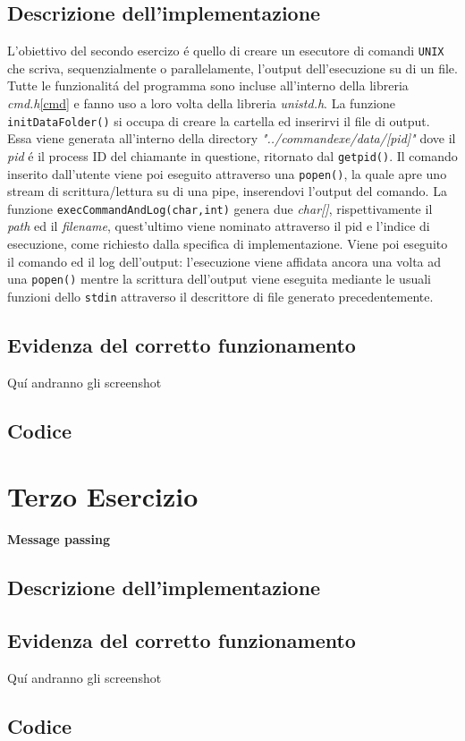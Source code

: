 \documentclass[a4paper]{article}
\begin{document}
\subsection{Descrizione dell'implementazione}
L'obiettivo del secondo esercizo \'e quello di creare un esecutore di comandi \texttt{UNIX} che scriva, sequenzialmente o parallelamente, l'output dell'esecuzione su di un file. \\
Tutte le funzionalit\'a del programma sono incluse all'interno della libreria \textit{cmd.h}\ref{cmd} e fanno uso a loro volta della libreria \textit{unistd.h}.
La funzione \texttt{initDataFolder()} si occupa di creare la cartella ed inserirvi il file di output. Essa viene generata all'interno della directory \textit{"../commandexe/data/[pid]"} dove il \textit{pid} \'e il process ID del chiamante in questione, ritornato dal \texttt{getpid()}.
Il comando inserito dall'utente viene poi eseguito attraverso una \texttt{popen()}, la quale apre uno stream di scrittura/lettura su di una pipe, inserendovi l'output del comando.
La funzione \texttt{execCommandAndLog(char,int)} genera due \textit{char[]}, rispettivamente il \textit{path} ed il \textit{filename}, quest'ultimo viene nominato attraverso il pid e l'indice di esecuzione, come richiesto dalla specifica di implementazione.
Viene poi eseguito il comando ed il log dell'output: l'esecuzione viene affidata ancora una volta ad una \texttt{popen()} mentre la scrittura dell'output viene eseguita mediante le usuali funzioni dello \texttt{stdin} attraverso il descrittore di file generato precedentemente.
\subsection{Evidenza del corretto funzionamento}
Qu\'i andranno gli screenshot
\subsection{Codice}


\newpage
\section{Terzo Esercizio}
\textbf{Message passing}
\subsection{Descrizione dell'implementazione}
\subsection{Evidenza del corretto funzionamento}
Qu\'i andranno gli screenshot
\subsection{Codice}
\end{document}
